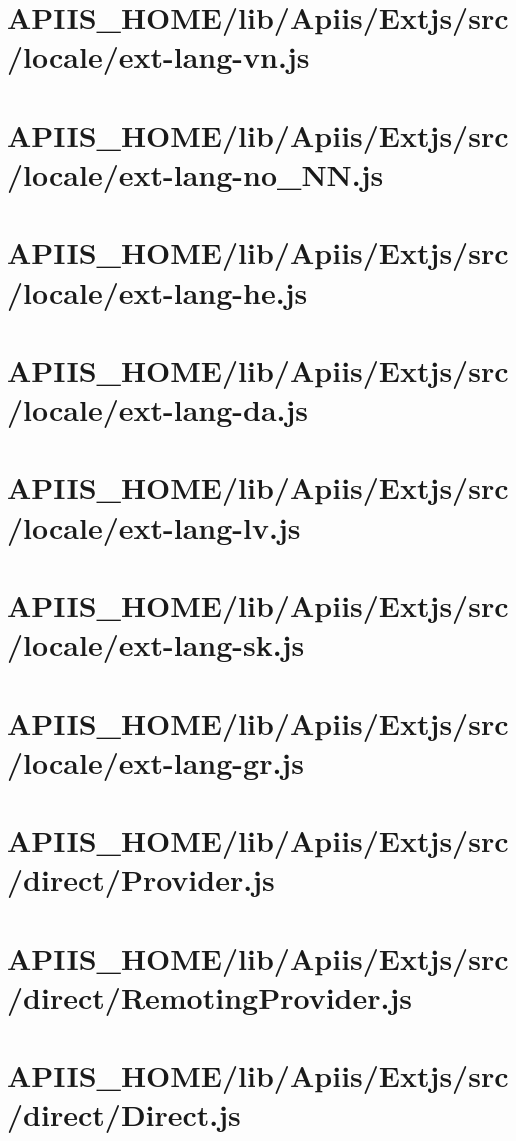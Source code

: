 \section{APIIS\_HOME/lib/Apiis/Extjs/src/locale/ext-lang-vn.js} 
\section{APIIS\_HOME/lib/Apiis/Extjs/src/locale/ext-lang-no\_NN.js} 
\section{APIIS\_HOME/lib/Apiis/Extjs/src/locale/ext-lang-he.js} 
\section{APIIS\_HOME/lib/Apiis/Extjs/src/locale/ext-lang-da.js} 
\section{APIIS\_HOME/lib/Apiis/Extjs/src/locale/ext-lang-lv.js} 
\section{APIIS\_HOME/lib/Apiis/Extjs/src/locale/ext-lang-sk.js} 
\section{APIIS\_HOME/lib/Apiis/Extjs/src/locale/ext-lang-gr.js} 
\section{APIIS\_HOME/lib/Apiis/Extjs/src/direct/Provider.js} 
\section{APIIS\_HOME/lib/Apiis/Extjs/src/direct/RemotingProvider.js} 
\section{APIIS\_HOME/lib/Apiis/Extjs/src/direct/Direct.js} 
